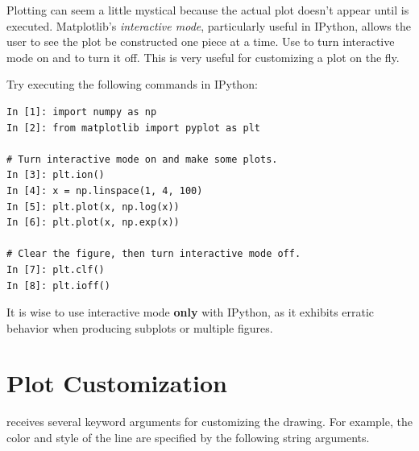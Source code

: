 \begin{info} %
Plotting can seem a little mystical because the actual plot doesn't appear until  is executed.
Matplotlib's \emph{interactive mode}, particularly useful in IPython, allows the user to see the plot be constructed one piece at a time.
Use  to turn interactive mode on and  to turn it off.
This is very useful for customizing a plot on the fly.

Try executing the following commands in IPython:

\begin{lstlisting}
In [1]: import numpy as np
In [2]: from matplotlib import pyplot as plt

# Turn interactive mode on and make some plots.
In [3]: plt.ion()
In [4]: x = np.linspace(1, 4, 100)
In [5]: plt.plot(x, np.log(x))
In [6]: plt.plot(x, np.exp(x))

# Clear the figure, then turn interactive mode off.
In [7]: plt.clf()
In [8]: plt.ioff()
\end{lstlisting}

It is wise to use interactive mode \textbf{only} with IPython, as it exhibits erratic behavior when producing subplots or multiple figures.
\end{info}

\section*{Plot Customization} %

 receives several keyword arguments for customizing the drawing.
For example, the color and style of the line are specified by the following string arguments.

